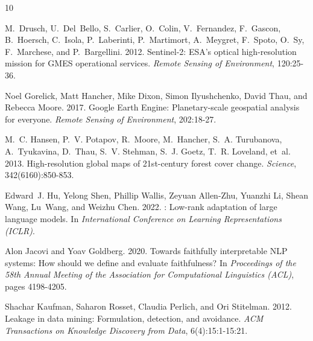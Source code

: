 \documentclass[11pt]{article}
\begin{document}
\begin{thebibliography}{10}
\providecommand{\natexlab}[1]{#1}

M.~Drusch, U.~Del~Bello, S.~Carlier, O.~Colin, V.~Fernandez, F.~Gascon,
  B.~Hoersch, C.~Isola, P.~Laberinti, P.~Martimort, A.~Meygret, F.~Spoto,
  O.~Sy, F.~Marchese, and P.~Bargellini. 2012.
\newblock Sentinel-2: {ESA}'s optical high-resolution mission for {GMES}
  operational services.
\newblock \emph{Remote Sensing of Environment}, 120:25-36.

Noel Gorelick, Matt Hancher, Mike Dixon, Simon Ilyushchenko, David Thau, and
  Rebecca Moore. 2017.
\newblock Google {Earth Engine}: Planetary-scale geospatial analysis for
  everyone.
\newblock \emph{Remote Sensing of Environment}, 202:18-27.

M.~C. Hansen, P.~V. Potapov, R.~Moore, M.~Hancher, S.~A. Turubanova,
  A.~Tyukavina, D.~Thau, S.~V. Stehman, S.~J. Goetz, T.~R. Loveland, et~al.
  2013.
\newblock High-resolution global maps of 21st-century forest cover change.
\newblock \emph{Science}, 342(6160):850-853.

Edward~J. Hu, Yelong Shen, Phillip Wallis, Zeyuan Allen-Zhu, Yuanzhi Li, Shean
  Wang, Lu~Wang, and Weizhu Chen. 2022.
: Low-rank adaptation of large language models.
\newblock In \emph{International Conference on Learning Representations
  (ICLR)}.

Alon Jacovi and Yoav Goldberg. 2020.
\newblock Towards faithfully interpretable {NLP} systems: How should we define
  and evaluate faithfulness?
\newblock In \emph{Proceedings of the 58th Annual Meeting of the Association
  for Computational Linguistics (ACL)}, pages 4198-4205.

Shachar Kaufman, Saharon Rosset, Claudia Perlich, and Ori Stitelman. 2012.
\newblock Leakage in data mining: Formulation, detection, and avoidance.
\newblock \emph{ACM Transactions on Knowledge Discovery from Data},
  6(4):15:1-15:21.


\end{thebibliography}
\end{document}

